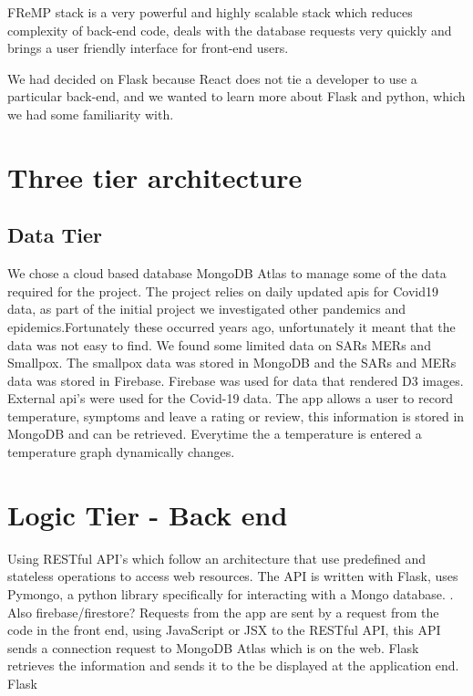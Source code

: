 FReMP stack is a very powerful and highly scalable stack which reduces complexity of back-end code, deals with the database requests very quickly and brings a user friendly interface for front-end users.

We had decided on Flask because React does not tie a developer to use a particular back-end, and we wanted to learn more about Flask and python, which we had some familiarity with.  



\section{Three tier architecture}
\subsection{Data Tier}
We chose a cloud based database MongoDB Atlas to manage some of the data required for the project. The project relies on daily updated apis for Covid19 data, as part of the initial project we investigated other pandemics and epidemics.Fortunately these occurred years ago, unfortunately it meant that the data was not easy to find. We found some limited data on SARs MERs and Smallpox. The smallpox data was stored in MongoDB and the SARs and MERs data was stored in Firebase.
Firebase was used for data that rendered D3 images. External api's were used for the Covid-19 data. The app allows a user to record temperature, symptoms and leave a rating or review, this information is stored in MongoDB and can be retrieved. Everytime the a temperature is entered a temperature graph dynamically changes. 

\section{Logic Tier - Back end}
Using RESTful API's which follow an architecture that use predefined and stateless operations to access web resources.
The API is written with Flask, uses Pymongo, a python library specifically for interacting with a Mongo database. . Also firebase/firestore? 
Requests from the app are sent by a request from the code in the front end, using JavaScript or JSX to the RESTful API, this API sends a connection request to MongoDB Atlas which is on the web. Flask retrieves the information and sends it to the be displayed at the application end.
Flask 

